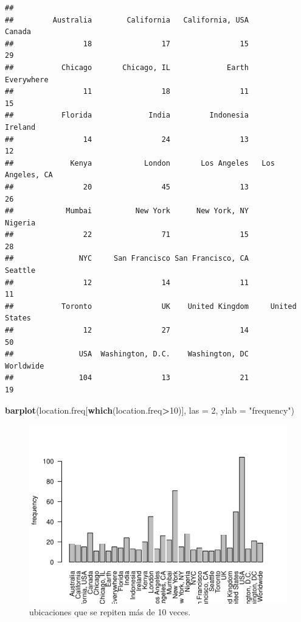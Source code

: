 \documentclass[]{article}
\newenvironment{Shaded}{\begin{snugshade}}{\end{snugshade}}
\newcommand{\DataTypeTok}[1]{\textcolor[rgb]{0.13,0.29,0.53}{#1}}
\newcommand{\DecValTok}[1]{\textcolor[rgb]{0.00,0.00,0.81}{#1}}
\newcommand{\KeywordTok}[1]{\textcolor[rgb]{0.13,0.29,0.53}{\textbf{#1}}}
\newcommand{\NormalTok}[1]{#1}
\newcommand{\OperatorTok}[1]{\textcolor[rgb]{0.81,0.36,0.00}{\textbf{#1}}}
\newcommand{\StringTok}[1]{\textcolor[rgb]{0.31,0.60,0.02}{#1}}
\begin{document}
\begin{verbatim}
## 
##         Australia        California   California, USA            Canada 
##                18                17                15                29 
##           Chicago       Chicago, IL             Earth        Everywhere 
##                11                18                11                15 
##           Florida             India         Indonesia           Ireland 
##                14                24                13                12 
##             Kenya            London       Los Angeles   Los Angeles, CA 
##                20                45                13                26 
##            Mumbai          New York      New York, NY           Nigeria 
##                22                71                15                28 
##               NYC     San Francisco San Francisco, CA           Seattle 
##                12                14                11                11 
##           Toronto                UK    United Kingdom     United States 
##                12                27                14                50 
##               USA  Washington, D.C.    Washington, DC         Worldwide 
##               104                13                21                19
\end{verbatim}

\begin{Shaded}
\begin{Highlighting}[]
\KeywordTok{barplot}\NormalTok{(location.freq[}\KeywordTok{which}\NormalTok{(location.freq}\OperatorTok{>}\DecValTok{10}\NormalTok{)], }\DataTypeTok{las =} \DecValTok{2}\NormalTok{,  }
        \DataTypeTok{ylab =} \StringTok{"frequency"}\NormalTok{)}
\end{Highlighting}
\end{Shaded}

\begin{figure}
	\begin{center}
		\includegraphics[width=0.8\linewidth]{document_files/figure-latex/unnamed-chunk-9-1} 
		\caption{ubicaciones que se repiten más de 10 veces.}
		\label{fig: ubicaciones que se repiten más de 10 veces}
	\end{center}
\end{figure}
\end{document}
